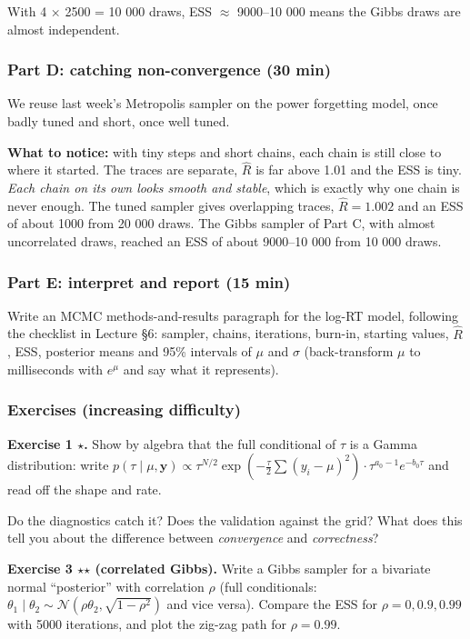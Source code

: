 With 4 × 2500 = 10 000 draws, ESS \ensuremath{\approx} 9000--10 000 means the Gibbs draws
are almost independent.

\subsubsection{Part D: catching non-convergence (30 min)}

We reuse last week's Metropolis sampler on the power forgetting model,
once badly tuned and short, once well tuned.

\textbf{What to notice:} with tiny steps and short chains, each chain is
still close to where it started. The traces are separate, \(\hat R\) is
far above 1.01 and the ESS is tiny. \emph{Each chain on its own looks
smooth and stable}, which is exactly why one chain is never enough. The
tuned sampler gives overlapping traces, \(\hat R = 1.002\) and an ESS of
about 1000 from 20 000 draws. The Gibbs sampler of Part C, with almost
uncorrelated draws, reached an ESS of about 9000--10 000 from 10 000
draws.

\subsubsection{Part E: interpret and report (15 min)}

Write an MCMC methods-and-results paragraph for the log-RT model,
following the checklist in Lecture §6: sampler, chains, iterations,
burn-in, starting values, \(\hat R\), ESS, posterior means and 95\%
intervals of \(\mu\) and \(\sigma\) (back-transform \(\mu\) to
milliseconds with \(e^\mu\) and say what it represents).

\subsubsection{Exercises (increasing difficulty)}

\textbf{Exercise 1 \ensuremath{\star}.} Show by algebra that the full conditional of
\(\tau\) is a Gamma distribution: write
\(p(\tau\mid\mu,\mathbf{y}) \propto \tau^{N/2}\exp(-\tfrac{\tau}{2}\sum(y_i-\mu)^2)\cdot\tau^{a_0-1}e^{-b_0\tau}\)
and read off the shape and rate.

Do the diagnostics catch it? Does the validation against the grid? What
does this tell you about the difference between \emph{convergence} and
\emph{correctness}?

\textbf{Exercise 3 \ensuremath{\star}\ensuremath{\star} (correlated Gibbs).} Write a Gibbs sampler for a
bivariate normal ``posterior'' with correlation \(\rho\) (full
conditionals:
\(\theta_1\mid\theta_2 \sim \mathcal{N}(\rho\theta_2, \sqrt{1-\rho^2})\)
and vice versa). Compare the ESS for \(\rho = 0, 0.9, 0.99\) with 5000
iterations, and plot the zig-zag path for \(\rho = 0.99\).

